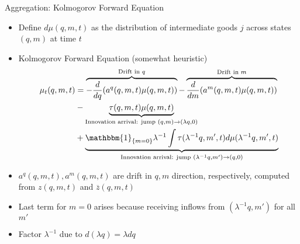 \documentclass[english,usenames,dvipsnames]{beamer}
\begin{document}
\begin{frame}{Aggregation: Kolmogorov Forward Equation}
\begin{itemize}
	\small
	\item Define $d\mu(q,m,t)$ as the distribution of intermediate goods $j$ across states $(q,m)$ at time $t$
	\item Kolmogorov Forward Equation (somewhat heuristic) 
	\begin{align*}
	\mu_t(q,m,t) &= \overbrace{-\frac{d}{dq} (a^q(q,m,t) \mu(q,m,t))}^{\text{Drift in $q$}} - \overbrace{\frac{d}{dm} (a^m(q,m,t) \mu(q,m,t))}^{\text{Drift in $m$}} \\ 
				 & - \underbrace{\tau(q,m,t)\mu(q,m,t)}_{\text{Innovation arrival: jump } (q,m) \to (\lambda q,0)} \\
				 & + \underbrace{\mathbbm{1}_{\{m = 0 \}}\lambda^{-1} \int \tau(\lambda^{-1}q,m',t) d\mu(\lambda^{-1}q,m',t)}_{\text{Innovation arrival: jump } (\lambda^{-1}q,m') \to (q,0)}
	\end{align*}
	\item $a^q(q,m,t),a^m(q,m,t)$ are drift in $q,m$ direction, respectively, computed from $z(q,m,t)$ and $\overline{z}(q,m,t)$
	\item Last term for $m = 0$ arises because receiving inflows from $(\lambda^{-1}q,m')$ for all $m'$ 
	\item Factor $\lambda^{-1}$ due to $d(\lambda q) = \lambda dq$
\end{itemize}
\end{frame}
\end{document}
